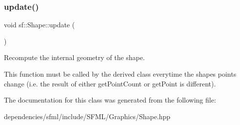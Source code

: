 \subsubsection{\texorpdfstring{update()}{update()}}
{\footnotesize\ttfamily void sf\+::\+Shape\+::update (\begin{DoxyParamCaption}{ }\end{DoxyParamCaption})\hspace{0.3cm}{\ttfamily [protected]}}



Recompute the internal geometry of the shape. 

This function must be called by the derived class everytime the shape\textquotesingle{}s points change (i.\+e. the result of either get\+Point\+Count or get\+Point is different). 

The documentation for this class was generated from the following file\+:\begin{DoxyCompactItemize}
\item 
dependencies/sfml/include/\+S\+F\+M\+L/\+Graphics/Shape.\+hpp\end{DoxyCompactItemize}
